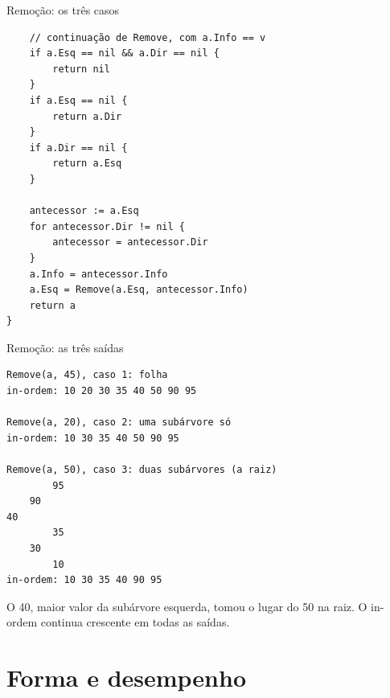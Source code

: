 \documentclass{beamer}
\begin{document}
\begin{frame}[fragile]{Remoção: os três casos}
\begin{verbatim}
	// continuação de Remove, com a.Info == v
	if a.Esq == nil && a.Dir == nil {
		return nil
	}
	if a.Esq == nil {
		return a.Dir
	}
	if a.Dir == nil {
		return a.Esq
	}

	antecessor := a.Esq
	for antecessor.Dir != nil {
		antecessor = antecessor.Dir
	}
	a.Info = antecessor.Info
	a.Esq = Remove(a.Esq, antecessor.Info)
	return a
}
\end{verbatim}
\end{frame}

\begin{frame}[fragile]{Remoção: as três saídas}
\begin{verbatim}
Remove(a, 45), caso 1: folha
in-ordem: 10 20 30 35 40 50 90 95

Remove(a, 20), caso 2: uma subárvore só
in-ordem: 10 30 35 40 50 90 95

Remove(a, 50), caso 3: duas subárvores (a raiz)
        95
    90
40
        35
    30
        10
in-ordem: 10 30 35 40 90 95
\end{verbatim}

  \vspace{0.2cm}
  O 40, maior valor da subárvore esquerda, tomou o lugar do 50 na raiz. O
  in-ordem continua crescente em todas as saídas.
\end{frame}

\section{Forma e desempenho}
\end{document}
